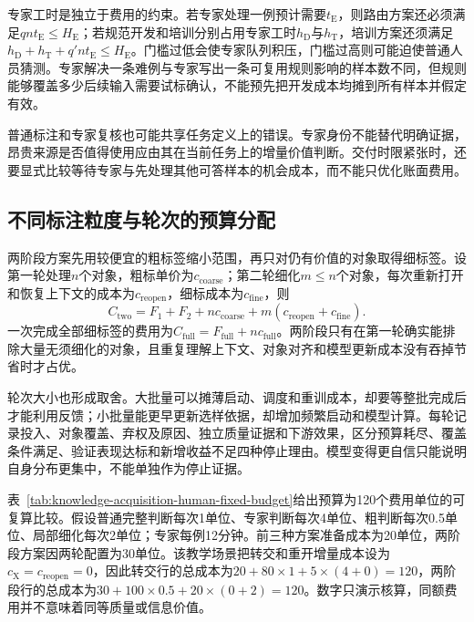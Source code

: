 专家工时是独立于费用的约束。若专家处理一例预计需要$t_{\mathrm{E}}$，则路由方案还必须满足$qn t_{\mathrm{E}}\leq H_{\mathrm{E}}$；若规范开发和培训分别占用专家工时$h_{\mathrm{D}}$与$h_{\mathrm{T}}$，培训方案还须满足$h_{\mathrm{D}}+h_{\mathrm{T}}+q'nt_{\mathrm{E}}\leq H_{\mathrm{E}}$。门槛过低会使专家队列积压，门槛过高则可能迫使普通人员猜测。专家解决一条难例与专家写出一条可复用规则影响的样本数不同，但规则能够覆盖多少后续输入需要试标确认，不能预先把开发成本均摊到所有样本并假定有效。

普通标注和专家复核也可能共享任务定义上的错误。专家身份不能替代明确证据，昂贵来源是否值得使用应由其在当前任务上的增量价值判断。交付时限紧张时，还要显式比较等待专家与先处理其他可答样本的机会成本，而不能只优化账面费用。

\subsection{不同标注粒度与轮次的预算分配}
\label{sec:knowledge-acquisition-human-granularity-round-budget}

两阶段方案先用较便宜的粗标签缩小范围，再只对仍有价值的对象取得细标签。设第一轮处理$n$个对象，粗标单价为$c_{\mathrm{coarse}}$；第二轮细化$m\leq n$个对象，每次重新打开和恢复上下文的成本为$c_{\mathrm{reopen}}$，细标成本为$c_{\mathrm{fine}}$，则
\begin{equation}
  C_{\mathrm{two}}
  =F_1+F_2+nc_{\mathrm{coarse}}
   +m(c_{\mathrm{reopen}}+c_{\mathrm{fine}}).
  \label{eq:knowledge-acquisition-human-two-stage-cost}
\end{equation}
一次完成全部细标签的费用为$C_{\mathrm{full}}=F_{\mathrm{full}}+nc_{\mathrm{full}}$。两阶段只有在第一轮确实能排除大量无须细化的对象，且重复理解上下文、对象对齐和模型更新成本没有吞掉节省时才占优。

轮次大小也形成取舍。大批量可以摊薄启动、调度和重训成本，却要等整批完成后才能利用反馈；小批量能更早更新选样依据，却增加频繁启动和模型计算。每轮记录投入、对象覆盖、弃权及原因、独立质量证据和下游效果，区分预算耗尽、覆盖条件满足、验证表现达标和新增收益不足四种停止理由。模型变得更自信只能说明自身分布更集中，不能单独作为停止证据。

表~\ref{tab:knowledge-acquisition-human-fixed-budget}给出预算为120个费用单位的可复算比较。假设普通完整判断每次1单位、专家判断每次4单位、粗判断每次0.5单位、局部细化每次2单位；专家每例12分钟。前三种方案准备成本为20单位，两阶段方案因两轮配置为30单位。该教学场景把转交和重开增量成本设为$c_{\mathrm{X}}=c_{\mathrm{reopen}}=0$，因此转交行的总成本为$20+80\times1+5\times(4+0)=120$，两阶段行的总成本为$30+100\times0.5+20\times(0+2)=120$。数字只演示核算，同额费用并不意味着同等质量或信息价值。

